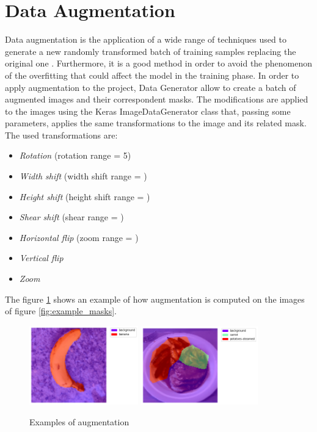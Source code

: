 \documentclass[a4paper,10pt]{report}
\begin{document}
\section{Data Augmentation}\label{sec:section-34}
Data augmentation is the application of a wide range of techniques used to generate a new randomly transformed batch of training samples replacing the original one \cite{augmentation}. Furthermore, it is a good method in order to avoid the phenomenon of the overfitting that could affect the model in the training phase. In order to apply augmentation to the project, Data Generator allow to create a batch of augmented images and their correspondent masks.
The modifications are applied to the images using the Keras ImageDataGenerator class that, passing some parameters, applies the same transformations to the image and its related mask.
The used transformations are:
\begin{itemize}
    \item \emph{Rotation} (rotation range = 5\textdegree)
    \item \emph{Width shift} (width shift range = )
    \item \emph{Height shift} (height shift range = )
    \item \emph{Shear shift} (shear range = )
    \item \emph{Horizontal flip} (zoom range = )
    \item \emph{Vertical flip}
    \item \emph{Zoom}
\end{itemize}

The figure \ref{fig:example_aug} shows an example of how augmentation is computed on the images of figure \ref{fig:example_masks}.

\begin{figure}[h]
    \centering
    \includegraphics[width=0.42\textwidth]{assets/img/banana_aug.png}
    \includegraphics[width=0.45\textwidth]{assets/img/potatoes_aug.png}
    \caption{Examples of augmentation}
    \label{fig:example_aug}
\end{figure}
\end{document}

